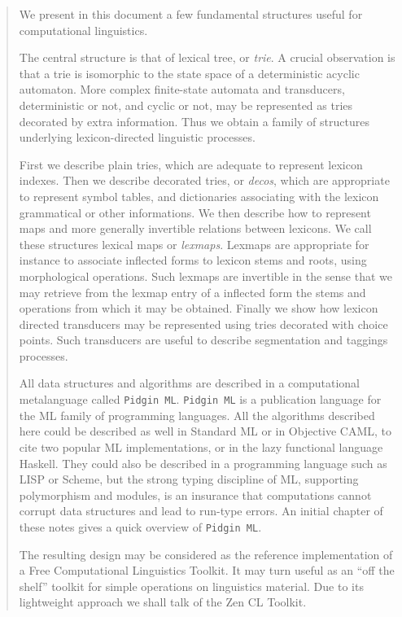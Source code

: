 \documentclass[12pt]{article}
\begin{document}
\tableofcontents
\newpage
\begin{abstract}
We present in this document a few fundamental structures useful for
computational linguistics. 

The central structure is that of lexical tree, or {\sl trie}.
A crucial observation is that a trie is isomorphic to the state space
of a deterministic acyclic automaton. More complex finite-state
automata and transducers, deterministic or not, and cyclic or
not, may be represented as tries decorated by extra information. Thus we
obtain a family of structures underlying lexicon-directed linguistic
processes.

First we describe plain tries, which are adequate to represent lexicon indexes.
Then we describe decorated tries, or {\sl decos}, which are appropriate to
represent symbol tables, and dictionaries associating with the lexicon
grammatical or other informations. We then describe how to represent
maps and more generally invertible relations between lexicons. We call these
structures lexical maps or {\sl lexmaps}. Lexmaps are appropriate for instance
to associate inflected forms to lexicon stems and roots, using morphological
operations. Such lexmaps are invertible in the sense that we may retrieve
from the lexmap entry of a inflected form the stems and operations from which
it may be obtained. Finally we show how lexicon directed transducers may
be represented using tries decorated with choice points. Such transducers
are useful to describe segmentation and taggings processes.

All data structures and algorithms are described
in a computational metalanguage called \verb:Pidgin ML:. \verb:Pidgin ML: is a 
publication language for the ML family of programming languages. All the
algorithms described here could be described as well in Standard ML
or in Objective CAML, to cite two popular ML implementations, or in the
lazy functional language Haskell. They could also be described in a 
programming language such as LISP or Scheme, but the strong typing discipline
of ML, supporting polymorphism and modules, is an insurance that computations
cannot corrupt data structures and lead to run-type errors. 
An initial chapter of these notes gives a quick overview of \verb:Pidgin ML:. 

The resulting design may be considered as the reference implementation of a Free 
Computational Linguistics Toolkit. It may turn useful as an ``off the shelf''
toolkit for simple operations on linguistics material. Due to its
lightweight approach we shall talk of the Zen CL Toolkit. 


\end{abstract}
\end{document}
